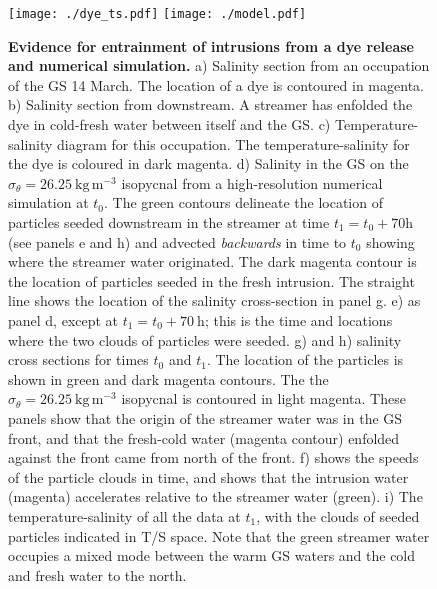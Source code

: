 \documentclass{article}
\begin{document}
\begin{figure}[htbp]
  \centering
    \texttt{[image: ./dye\_ts.pdf]}
    \texttt{[image: ./model.pdf]}
  \caption{{\bf Evidence for entrainment of intrusions from a dye release and numerical simulation.}
a) Salinity section from an occupation of the GS 14 March. The location of a dye is contoured in magenta.  b) Salinity section from downstream.  A streamer has enfolded the dye in cold-fresh water between itself and the GS.  c) Temperature-salinity diagram for this occupation.  The temperature-salinity for the dye is coloured in dark magenta.  
d) Salinity in the GS on the $\sigma_{\theta}=26.25\  \mathrm{kg\,m^{-3}}$ isopycnal from a high-resolution numerical simulation at $t_0$.  The green contours delineate the location of particles seeded downstream in the streamer at time $t_1=t_0+70 \mathrm{h}$ (see panels e and h) and advected \emph{backwards} in time to $t_0$ showing where the streamer water originated. The dark magenta contour is the location of particles seeded in the fresh intrusion.  The straight line shows the location of the salinity cross-section in panel g.  e) as panel d, except at $t_1=t_0+70\ \mathrm{h}$; this is the time and locations where the two clouds of particles were seeded.  g) and h) salinity cross sections for times $t_0$ and $t_1$.  The location of the particles is shown in green and dark magenta contours.  The the $\sigma_{\theta}=26.25\  \mathrm{kg\,m^{-3}}$ isopycnal is contoured in light magenta.  These panels show that the origin of the streamer water was in the GS front, and that the fresh-cold water (magenta contour) enfolded against the front came from north of the front.  f) shows the speeds of the particle clouds in time, and shows that the intrusion water (magenta) accelerates relative to the streamer water (green).  i) The temperature-salinity of all the data at $t_1$, with the clouds of seeded particles indicated in T/S space.  Note that the green streamer water occupies a  mixed mode between the warm GS waters and the cold and fresh water to the north.  
  } \label{fig:StreamersModel}
\end{figure}


\end{document}
